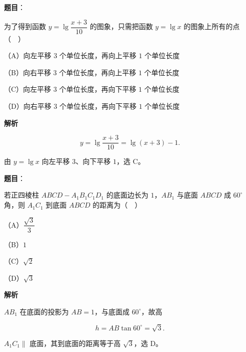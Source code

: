 \begin{answer}

\textbf{题目}：

为了得到函数 $y=\lg\dfrac{x+3}{10}$ 的图象，只需把函数 $y=\lg x$ 的图象上所有的点（　）

（A）向左平移 $3$ 个单位长度，再向上平移 $1$ 个单位长度

（B）向右平移 $3$ 个单位长度，再向上平移 $1$ 个单位长度

（C）向左平移 $3$ 个单位长度，再向下平移 $1$ 个单位长度

（D）向右平移 $3$ 个单位长度，再向下平移 $1$ 个单位长度

\textbf{解析}

\nopagebreak[4]
\[y=\lg\frac{x+3}{10}=\lg(x+3)-1 .\]

由 $y=\lg x$ 向左平移 $3$、向下平移 $1$，选 C。


\end{answer}
\begin{answer}

\textbf{题目}：

若正四棱柱 $ABCD-A_1B_1C_1D_1$ 的底面边长为 $1$，$AB_1$ 与底面 $ABCD$ 成 $60^\circ$ 角，则 $A_1C_1$ 到底面 $ABCD$ 的距离为（　）

（A）$\dfrac{\sqrt3}{3}$

（B）$1$

（C）$\sqrt2$

（D）$\sqrt3$

\textbf{解析}

$AB_1$ 在底面的投影为 $AB=1$，与底面成 $60^\circ$，故高

\nopagebreak[4]
\[h=AB\tan60^\circ=\sqrt3 .\]

$A_1C_1\parallel$ 底面，其到底面的距离等于高 $\sqrt3$，选 D。


\end{answer}
